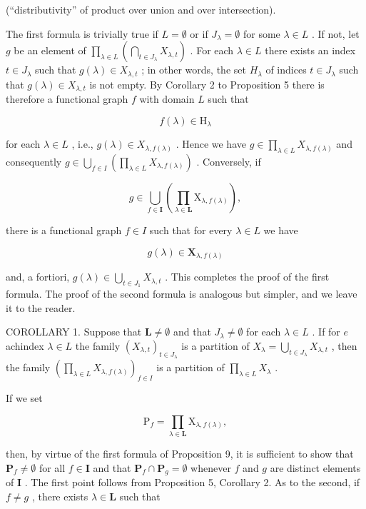 (``distributivity'' of product over union and over intersection).

The first formula is trivially true if \(L = \emptyset\) or if \(J_{\lambda} = \emptyset\) for some \(\lambda \in L\) . If not, let \(g\) be an element of \(\prod_{\lambda \in L} \left( \bigcap_{t \in J_{\lambda}} X_{\lambda, t} \right)\) . For each \(\lambda \in L\) there exists an index \(t \in J_{\lambda}\) such that \(g(\lambda) \in X_{\lambda, t}\) ; in other words, the set \(H_{\lambda}\) of indices \(t \in J_{\lambda}\) such that \(g(\lambda) \in X_{\lambda, t}\) is not empty. By Corollary 2 to Proposition 5 there is therefore a functional graph \(f\) with domain \(L\) such that

\[
f (\lambda) \in \mathrm{H} _ {\lambda}
\]

for each \(\lambda \in L\) , i.e., \(g(\lambda) \in X_{\lambda, f(\lambda)}\) . Hence we have \(g \in \prod_{\lambda \in L} X_{\lambda, f(\lambda)}\) and consequently \(g \in \bigcup_{f \in I} \left( \prod_{\lambda \in L} X_{\lambda, f(\lambda)} \right)\) . Conversely, if

\[
g \in \bigcup_ {f \in \mathbf {I}} \left(\prod_ {\lambda \in \mathbf {L}} \mathrm{X} _ {\lambda , f (\lambda)}\right),
\]

there is a functional graph \(f \in I\) such that for every \(\lambda \in L\) we have

\[
g (\lambda) \in \mathbf {X} _ {\lambda , f (\lambda)}
\]

and, a fortiori, \(g(\lambda) \in \bigcup_{t \in J_1} X_{\lambda,t}\) . This completes the proof of the first formula. The proof of the second formula is analogous but simpler, and we leave it to the reader.

COROLLARY 1. Suppose that \(\mathbf{L} \neq \emptyset\) and that \(J_{\lambda} \neq \emptyset\) for each \(\lambda \in L\) . If for \(e\) achindex \(\lambda \in L\) the family \((X_{\lambda, t})_{t \in J_{\lambda}}\) is a partition of \(X_{\lambda} = \bigcup_{t \in J_{\lambda}} X_{\lambda, t}\) , then the family \(\left( \prod_{\lambda \in L} X_{\lambda, f(\lambda)} \right)_{f \in I}\) is a partition of \(\prod_{\lambda \in L} X_{\lambda}\) .

If we set

\[
\mathrm{P} _ {f} = \prod_ {\lambda \in \mathbf {L}} \mathrm{X} _ {\lambda , f (\lambda)},
\]

then, by virtue of the first formula of Proposition 9, it is sufficient to show that \(\mathbf{P}_f \neq \emptyset\) for all \(f \in \mathbf{I}\) and that \(\mathbf{P}_f \cap \mathbf{P}_g = \emptyset\) whenever \(f\) and \(g\) are distinct elements of \(\mathbf{I}\) . The first point follows from Proposition 5, Corollary 2. As to the second, if \(f \neq g\) , there exists \(\lambda \in \mathbf{L}\) such that

